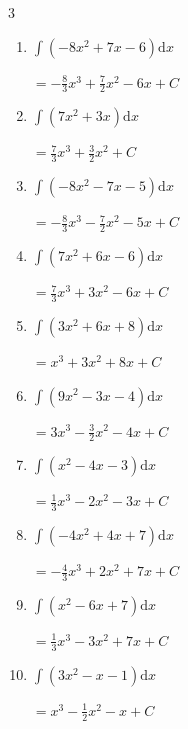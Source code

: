 \begin{multicols}{3}
\begin{enumerate}
        $\displaystyle =\frac{5}{3}x^{3}-\frac{5}{2}x^{2}+ C$

  \item $\displaystyle \int \left( -8x^{2}+7x-6 \right) \mathrm{d}x$

        $\displaystyle =-\frac{8}{3}x^{3}+\frac{7}{2}x^{2}-6x+ C$

\columnbreak %

  \item $\displaystyle \int \left( 7x^{2}+3x \right) \mathrm{d}x$

        $\displaystyle =\frac{7}{3}x^{3}+\frac{3}{2}x^{2}+ C$

  \item $\displaystyle \int \left( -8x^{2}-7x-5 \right) \mathrm{d}x$

        $\displaystyle =-\frac{8}{3}x^{3}-\frac{7}{2}x^{2}-5x+ C$

  \item $\displaystyle \int \left( 7x^{2}+6x-6 \right) \mathrm{d}x$

        $\displaystyle =\frac{7}{3}x^{3}+3x^{2}-6x+ C$

  \item $\displaystyle \int \left( 3x^{2}+6x+8 \right) \mathrm{d}x$

        $\displaystyle =x^{3}+3x^{2}+8x+ C$

  \item $\displaystyle \int \left( 9x^{2}-3x-4 \right) \mathrm{d}x$

        $\displaystyle =3x^{3}-\frac{3}{2}x^{2}-4x+ C$

  \item $\displaystyle \int \left( x^{2}-4x-3 \right) \mathrm{d}x$

        $\displaystyle =\frac{1}{3}x^{3}-2x^{2}-3x+ C$

  \item $\displaystyle \int \left( -4x^{2}+4x+7 \right) \mathrm{d}x$

        $\displaystyle =-\frac{4}{3}x^{3}+2x^{2}+7x+ C$

  \item $\displaystyle \int \left( x^{2}-6x+7 \right) \mathrm{d}x$

        $\displaystyle =\frac{1}{3}x^{3}-3x^{2}+7x+ C$

  \item $\displaystyle \int \left( 3x^{2}-x-1 \right) \mathrm{d}x$

        $\displaystyle =x^{3}-\frac{1}{2}x^{2}-x+ C$


\end{enumerate}
\end{multicols}
